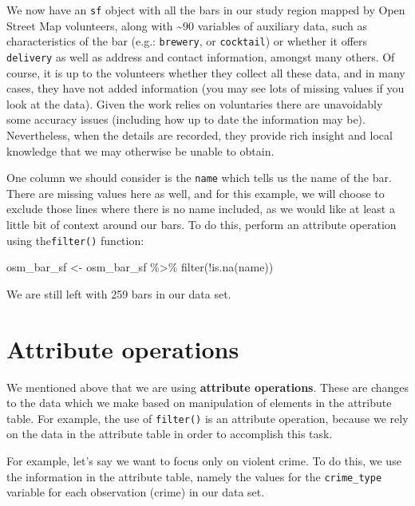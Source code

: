 \documentclass[
]{book}
\newenvironment{Shaded}{\begin{snugshade}}{\end{snugshade}}
\newcommand{\FunctionTok}[1]{\textcolor[rgb]{0.00,0.00,0.00}{#1}}
\newcommand{\NormalTok}[1]{#1}
\newcommand{\OtherTok}[1]{\textcolor[rgb]{0.56,0.35,0.01}{#1}}
\newcommand{\SpecialCharTok}[1]{\textcolor[rgb]{0.00,0.00,0.00}{#1}}
\begin{document}
We now have an \texttt{sf} object with all the bars in our study region mapped by Open Street Map volunteers, along with \textasciitilde90 variables of auxiliary data, such as characteristics of the bar (e.g.: \texttt{brewery}, or \texttt{cocktail}) or whether it offers \texttt{delivery} as well as address and contact information, amongst many others. Of course, it is up to the volunteers whether they collect all these data, and in many cases, they have not added information (you may see lots of missing values if you look at the data). Given the work relies on voluntaries there are unavoidably some accuracy issues (including how up to date the information may be). Nevertheless, when the details are recorded, they provide rich insight and local knowledge that we may otherwise be unable to obtain.

One column we should consider is the \texttt{name} which tells us the name of the bar. There are missing values here as well, and for this example, we will choose to exclude those lines where there is no name included, as we would like at least a little bit of context around our bars. To do this, perform an attribute operation using the\texttt{filter()} function:

\begin{Shaded}
\begin{Highlighting}[]
\NormalTok{osm\_bar\_sf }\OtherTok{\textless{}{-}}\NormalTok{ osm\_bar\_sf }\SpecialCharTok{\%\textgreater{}\%} \FunctionTok{filter}\NormalTok{(}\SpecialCharTok{!}\FunctionTok{is.na}\NormalTok{(name))}
\end{Highlighting}
\end{Shaded}

We are still left with 259 bars in our data set.

\hypertarget{attribute-operations}{%
\section{Attribute operations}\label{attribute-operations}}

We mentioned above that we are using \textbf{attribute operations}. These are changes to the data which we make based on manipulation of elements in the attribute table. For example, the use of \texttt{filter()} is an attribute operation, because we rely on the data in the attribute table in order to accomplish this task.

For example, let's say we want to focus only on violent crime. To do this, we use the information in the attribute table, namely the values for the \texttt{crime\_type} variable for each observation (crime) in our data set.
\end{document}
